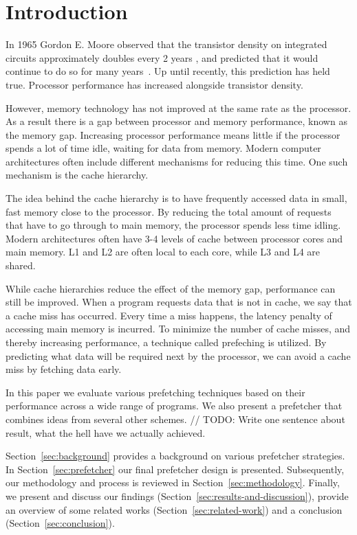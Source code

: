 \section{Introduction}
\label{sec:introduction}

In 1965 Gordon E. Moore observed that the transistor density on integrated circuits approximately doubles every 2 years ,
and predicted that it would continue to do so for many years~\cite{bib:moore}.
Up until recently, this prediction has held true.
Processor performance has increased alongside transistor density.

However, memory technology has not improved at the same rate as the processor.
As a result there is a gap between processor and memory performance, known as the memory gap.
Increasing processor performance means little if the processor spends a lot of time idle, waiting for data from memory.
Modern computer architectures often include different mechanisms for reducing this time.
One such mechanism is the cache hierarchy.

The idea behind the cache hierarchy is to have frequently accessed data in small, fast memory close to the processor.
By reducing the total amount of requests that have to go through to main memory, the processor spends less time idling.
Modern architectures often have 3-4 levels of cache between processor cores and main memory.
L1 and L2 are often local to each core, while L3 and L4 are shared.

While cache hierarchies reduce the effect of the memory gap, performance can still be improved.
When a program requests data that is not in cache, we say that a cache miss has occurred.
Every time a miss happens, the latency penalty of accessing main memory is incurred.
To minimize the number of cache misses, and thereby increasing performance, a technique called prefeching is utilized.
By predicting what data will be required next by the processor, we can avoid a cache miss by fetching data early.

In this paper we evaluate various prefetching techniques based on their performance across a wide range of programs.
We also present a prefetcher that combines ideas from several other schemes.
// TODO: Write one sentence about result, what the hell have we actually achieved.

Section~\ref{sec:background} provides a background on various prefetcher strategies.
In Section~\ref{sec:prefetcher} our final prefetcher design is presented.
Subsequently, our methodology and process is reviewed in Section~\ref{sec:methodology}.
Finally, we present and discuss our findings (Section~\ref{sec:results-and-discussion}), provide an overview of some related works (Section~\ref{sec:related-work}) and a conclusion (Section~\ref{sec:conclusion}).

